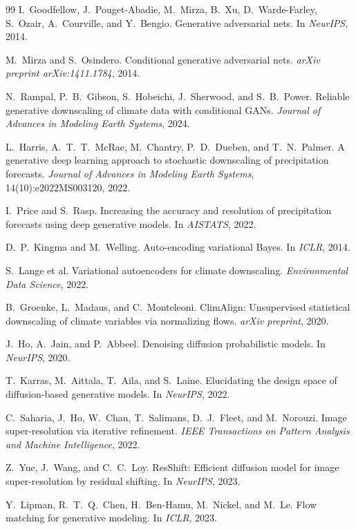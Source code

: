 \documentclass[14pt,a4paper,openany]{extreport}
\begin{document}
\begin{thebibliography}{99}
 I.~Goodfellow, J.~Pouget-Abadie, M.~Mirza, B.~Xu, D.~Warde-Farley, S.~Ozair, A.~Courville, and Y.~Bengio. Generative adversarial nets. In \emph{NeurIPS}, 2014.

 M.~Mirza and S.~Osindero. Conditional generative adversarial nets. \emph{arXiv preprint arXiv:1411.1784}, 2014.

 N.~Rampal, P.~B.~Gibson, S.~Hobeichi, J.~Sherwood, and S.~B.~Power. Reliable generative downscaling of climate data with conditional GANs. \emph{Journal of Advances in Modeling Earth Systems}, 2024.

 L.~Harris, A.~T.~T.~McRae, M.~Chantry, P.~D.~Dueben, and T.~N.~Palmer. A generative deep learning approach to stochastic downscaling of precipitation forecasts. \emph{Journal of Advances in Modeling Earth Systems}, 14(10):e2022MS003120, 2022.

 I.~Price and S.~Rasp. Increasing the accuracy and resolution of precipitation forecasts using deep generative models. In \emph{AISTATS}, 2022.

 D.~P.~Kingma and M.~Welling. Auto-encoding variational Bayes. In \emph{ICLR}, 2014.

 S.~Lange et al. Variational autoencoders for climate downscaling. \emph{Environmental Data Science}, 2022.

 B.~Groenke, L.~Madaus, and C.~Monteleoni. ClimAlign: Unsupervised statistical downscaling of climate variables via normalizing flows. \emph{arXiv preprint}, 2020.

 J.~Ho, A.~Jain, and P.~Abbeel. Denoising diffusion probabilistic models. In \emph{NeurIPS}, 2020.

 T.~Karras, M.~Aittala, T.~Aila, and S.~Laine. Elucidating the design space of diffusion-based generative models. In \emph{NeurIPS}, 2022.

 C.~Saharia, J.~Ho, W.~Chan, T.~Salimans, D.~J.~Fleet, and M.~Norouzi. Image super-resolution via iterative refinement. \emph{IEEE Transactions on Pattern Analysis and Machine Intelligence}, 2022.

 Z.~Yue, J.~Wang, and C.~C.~Loy. ResShift: Efficient diffusion model for image super-resolution by residual shifting. In \emph{NeurIPS}, 2023.

 Y.~Lipman, R.~T.~Q.~Chen, H.~Ben-Hamu, M.~Nickel, and M.~Le. Flow matching for generative modeling. In \emph{ICLR}, 2023.


\end{thebibliography}
\end{document}
